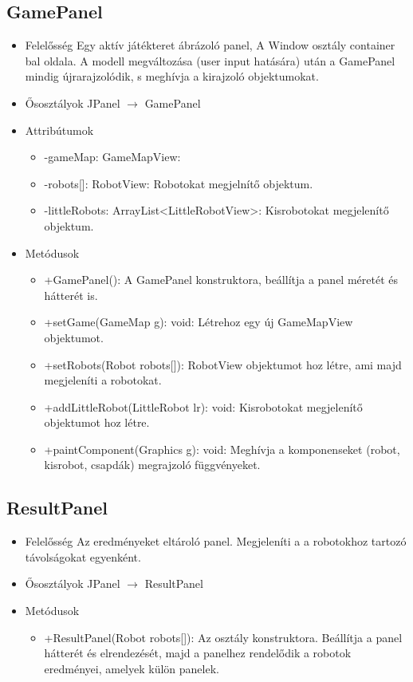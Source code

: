 \subsection{GamePanel}
\begin{itemize}
	\item Felelősség\newline
	Egy aktív játékteret ábrázoló panel, A Window osztály container bal oldala. A modell megváltozása (user input hatására) után a GamePanel mindig újrarajzolódik, s meghívja a kirajzoló objektumokat.
	\item Ősosztályok\newline
		JPanel $\rightarrow$ GamePanel
	\item Attribútumok\newline
	\begin{itemize}
		\item -gameMap: GameMapView:
		\item -robots[]: RobotView: Robotokat megjelnítő objektum.
		\item -littleRobots: ArrayList<LittleRobotView>: Kisrobotokat megjelenítő objektum. 
	\end{itemize}
	\item Metódusok\newline
	\begin{itemize}
		\item +GamePanel(): A GamePanel konstruktora, beállítja a panel méretét és hátterét is.
		\item +setGame(GameMap g): void: Létrehoz egy új GameMapView objektumot.
		\item +setRobots(Robot robots[]): RobotView objektumot hoz létre, ami majd megjeleníti a robotokat.
		\item +addLittleRobot(LittleRobot lr): void: Kisrobotokat megjelenítő objektumot hoz létre.
		\item +paintComponent(Graphics g): void: Meghívja a komponenseket (robot, kisrobot, csapdák) megrajzoló függvényeket.
	\end{itemize}
\end{itemize}

\subsection{ResultPanel}
\begin{itemize}
	\item Felelősség\newline
	Az eredményeket eltároló panel. Megjeleníti a a robotokhoz tartozó távolságokat egyenként.
	\item Ősosztályok\newline
		JPanel $\rightarrow$ ResultPanel
		
		\item Metódusok\newline
		\begin{itemize}
			\item +ResultPanel(Robot robots[]): Az osztály konstruktora. Beállítja a panel hátterét és elrendezését, majd a panelhez rendelődik a robotok eredményei, amelyek külön panelek.
		\end{itemize}
	\end{itemize}
	
